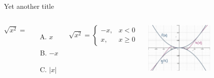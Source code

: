 \documentclass{beamer}
\begin{document}
\begin{frame}{Yet another title} \vspace{10pt}

\begin{columns}[onlytextwidth]


$\sqrt{x^2} = $ \\[10pt]

\begin{enumerate}[(A)]	%

\item $x$
\item $-x$
\item $|x|$

\end{enumerate}



{
$
\sqrt{x^2} = 
\begin{cases}
-x, & x<0 \\ %
x, & x\geq 0 %
\end{cases}
$ 
\\[10pt]
}

{
\includegraphics[width=0.6\textwidth]{limit}
}

\end{columns}

\end{frame}
\end{document}

